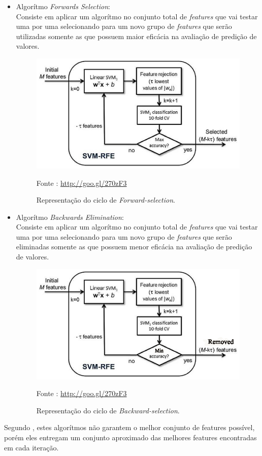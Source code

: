         \begin{itemize}
            \item Algorítmo \textit{Forwards Selection}: \\ Consiste em aplicar um algorítmo no conjunto total de \textit{features} que vai testar uma por uma selecionando para um novo grupo de \textit{features} que serão utilizadas somente as que possuem maior eficácia na avaliação de predição de valores.

            \begin{figure}[ht]
                \centering
                \label{fig06}
                    \includegraphics[keepaspectratio=true, scale=1.2]{editaveis/images/forward-selection.eps}
                \caption{Representação do ciclo de \textit{Forward-selection}.}
                Fonte : \url{http://goo.gl/270zF3}
            \end{figure}

            \item Algorítmo \textit{Backwards Elimination}: \\ Consiste em aplicar um algorítmo no conjunto total de \textit{features} que vai testar uma por uma selecionando para um novo grupo de \textit{features} que serão eliminadas somente as que possuem menor eficácia na avaliação de predição de valores.

            \begin{figure}[ht]
                \centering
                \label{fig06}
                    \includegraphics[keepaspectratio=true, scale=1.2]{editaveis/images/backward-selection.eps}
                \caption{Representação do ciclo de \textit{Backward-selection}.}
                Fonte : \url{http://goo.gl/270zF3}
            \end{figure}

        \end{itemize}

        Segundo \cite{brink2015}, estes algorítmos não garantem o melhor conjunto de features possível, porém eles entregam um conjunto aproximado das melhores features encontradas em cada iteração.

